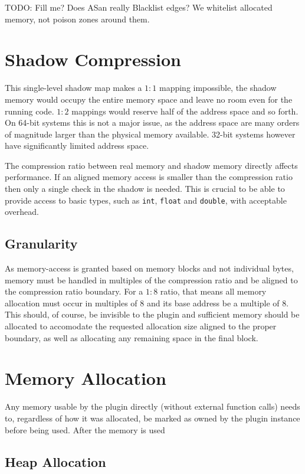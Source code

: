 TODO: Fill me? Does ASan really Blacklist edges? We whitelist allocated memory,
not poison zones around them.


\section {Shadow Compression}

This single-level shadow map makes a $1:1$ mapping impossible, the shadow memory
would occupy the entire memory space and leave no room even for the running
code. $1:2$ mappings would reserve half of the address space and so forth. On
64-bit systems this is not a major issue, as the address space are many orders
of magnitude larger than the physical memory available. 32-bit systems however
have significantly limited address space.

The compression ratio between real memory and shadow memory directly affects
performance. If an aligned memory access is smaller than the compression ratio
then only a single check in the shadow is needed. This is crucial to be able to
provide access to basic types, such as \texttt{int}, \texttt{float} and
\texttt{double}, with acceptable overhead.

\subsection {Granularity}

As memory-access is granted based on memory blocks and not individual bytes,
memory must be handled in multiples of the compression ratio and be aligned to
the compression ratio boundary. For a $1:8$ ratio, that means all memory
allocation must occur in multiples of $8$ and its base address be a multiple of
$8$. This should, of course, be invisible to the plugin and sufficient memory
should be allocated to accomodate the requested allocation size aligned to the
proper boundary, as well as allocating any remaining space in the final block.


\section {Memory Allocation}

Any memory usable by the plugin directly (without external function calls) needs
to, regardless of how it was allocated, be marked as owned by the plugin
instance before being used. After the memory is used 

\subsection {Heap Allocation}

